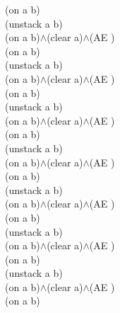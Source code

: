{{(on a b)\\
(unstack a b)\\
(on a b)$\wedge$(clear a)$\wedge$(AE )\\
(on a b)\\
(unstack a b)\\
(on a b)$\wedge$(clear a)$\wedge$(AE )\\
(on a b)\\
(unstack a b)\\
(on a b)$\wedge$(clear a)$\wedge$(AE )\\
(on a b)\\
(unstack a b)\\
(on a b)$\wedge$(clear a)$\wedge$(AE )\\
(on a b)\\
(unstack a b)\\
(on a b)$\wedge$(clear a)$\wedge$(AE )\\
(on a b)\\
(unstack a b)\\
(on a b)$\wedge$(clear a)$\wedge$(AE )\\
(on a b)\\
(unstack a b)\\
(on a b)$\wedge$(clear a)$\wedge$(AE )\\
(on a b)\\
}%
}

